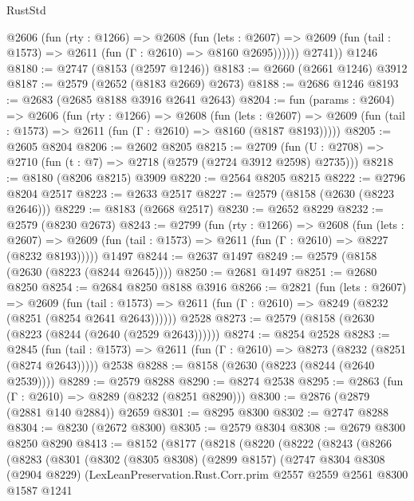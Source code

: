 \begin{lexlean}{RustStd}
\begin{coremodule}
          @2606
            (fun (rty : @1266) =>
            @2608
              (fun (lets : @2607) =>
              @2609 (fun (tail : @1573) => @2611 (fun (Γ : @2610) => @8160 @2695))))))
        @2741))
    @1246
@8180 := @2747 (@8153 (@2597 @1246))
@8183 := @2660 (@2661 @1246) @3912
@8187 := @2579 (@2652 (@8183 @2669) @2673)
@8188 := @2686 @1246
@8193 := @2683 (@2685 @8188 @3916 @2641 @2643)
@8204 := fun (params : @2604) =>
  @2606
    (fun (rty : @1266) =>
    @2608
      (fun (lets : @2607) =>
      @2609 (fun (tail : @1573) => @2611 (fun (Γ : @2610) => @8160 (@8187 @8193)))))
@8205 := @2605 @8204
@8206 := @2602 @8205
@8215 := @2709 (fun (U : @2708) => @2710 (fun (t : @7) => @2718 (@2579 (@2724 @3912 @2598) @2735)))
@8218 := @8180 (@8206 @8215) @3909
@8220 := @2564 @8205 @8215
@8222 := @2796 @8204 @2517
@8223 := @2633 @2517
@8227 := @2579 (@8158 (@2630 (@8223 @2646)))
@8229 := @8183 (@2668 @2517)
@8230 := @2652 @8229
@8232 := @2579 (@8230 @2673)
@8243 := @2799
    (fun (rty : @1266) =>
    @2608
      (fun (lets : @2607) =>
      @2609 (fun (tail : @1573) => @2611 (fun (Γ : @2610) => @8227 (@8232 @8193)))))
    @1497
@8244 := @2637 @1497
@8249 := @2579 (@8158 (@2630 (@8223 (@8244 @2645))))
@8250 := @2681 @1497
@8251 := @2680 @8250
@8254 := @2684 @8250 @8188 @3916
@8266 := @2821
    (fun (lets : @2607) =>
    @2609
      (fun (tail : @1573) => @2611 (fun (Γ : @2610) => @8249 (@8232 (@8251 (@8254 @2641 @2643))))))
    @2528
@8273 := @2579 (@8158 (@2630 (@8223 (@8244 (@2640 (@2529 @2643))))))
@8274 := @8254 @2528
@8283 := @2845
    (fun (tail : @1573) => @2611 (fun (Γ : @2610) => @8273 (@8232 (@8251 (@8274 @2643)))))
    @2538
@8288 := @8158 (@2630 (@8223 (@8244 (@2640 @2539))))
@8289 := @2579 @8288
@8290 := @8274 @2538
@8295 := @2863 (fun (Γ : @2610) => @8289 (@8232 (@8251 @8290)))
@8300 := @2876 (@2879 (@2881 @140 @2884)) @2659
@8301 := @8295 @8300
@8302 := @2747 @8288
@8304 := @8230 (@2672 @8300)
@8305 := @2579 @8304
@8308 := @2679 @8300 @8250 @8290
@8413 := @8152
    (@8177
      (@8218
        (@8220
          (@8222
            (@8243
              (@8266
                (@8283
                  (@8301
                    (@8302
                      (@8305 @8308)
                      (@2899 @8157)
                      (@2747
                        @8304
                        @8308
                        (@2904 @8229)
                        (LexLeanPreservation.Rust.Corr.prim
                          @2557
                          @2559
                          @2561
                          @8300
                          @1587
                          @1241

\end{coremodule}
\end{lexlean}
